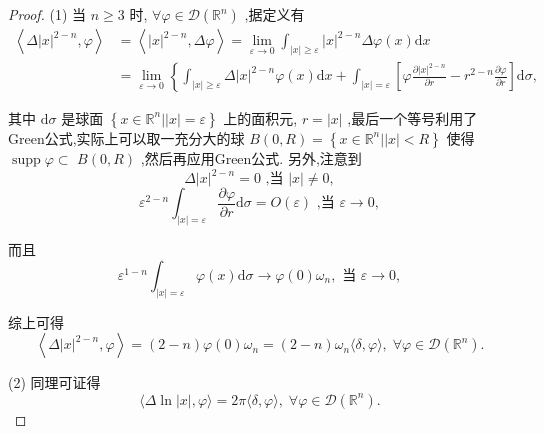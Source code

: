 \documentclass[lang=cn,newtx,10pt,scheme=chinese,thmcnt=chapter]{elegantbook}
\newcommand{\dif}{\mathrm{d}}
\begin{document}
\begin{proof}
  (1) 当 \(n \geq  3\) 时, \(\forall \varphi  \in  \mathcal{D}\left( {\mathbb{R}}^{n}\right)\) ,据定义有  
\begin{equation*}
\begin{aligned}
      \left\langle  {\Delta {\left| x\right| }^{2 - n},\varphi }\right\rangle  & = \left\langle  {{\left| x\right| }^{2 - n},{\Delta \varphi }}\right\rangle   = \mathop{\lim }\limits_{{\varepsilon  \rightarrow  0}}{\int }_{\left| x\right|  \geq  \varepsilon }{\left| x\right| }^{2 - n}{\Delta \varphi }\left( x\right) {\dif x}\\  &= \mathop{\lim }\limits_{{\varepsilon  \rightarrow  0}}\left\{  {{\int }_{\left| x\right|  \geq  \varepsilon }\Delta {\left| x\right| }^{2 - n}\varphi \left( x\right) {\dif x}}\right.
  + {\int }_{\left| x\right|  = \varepsilon }\left\lbrack  {\varphi \frac{\partial {\left| x\right| }^{2 - n}}{\partial r} - {r}^{2 - n}\frac{\partial \varphi }{\partial r}}\right\rbrack  {\dif\sigma },
\end{aligned}
  \end{equation*}
  
  其中 \({\dif\sigma }\) 是球面 \(\left\{  {x \in  {\mathbb{R}}^{n}\left| \right| x \mid   = \varepsilon }\right\}\) 上的面积元, \(r = \left| x\right|\) ,最后一个等号利用了Green公式,实际上可以取一充分大的球 \(B\left( {0,R}\right)  = \left\{  {x \in  {\mathbb{R}}^{n}\left| \right| x \mid   < R}\right\}\) 使得 \(\operatorname{supp}\varphi  \subset\)  \(B\left( {0,R}\right)\) ,然后再应用Green公式. 另外,注意到
  \begin{equation*}
  \Delta {\left| x\right| }^{2 - n} = 0\text{ ,当 }\left| x\right|  \neq  0,
  \end{equation*}\begin{equation*}
  {\varepsilon }^{2 - n}{\int }_{\left| x\right|  = \varepsilon }\frac{\partial \varphi }{\partial r}{\dif\sigma } = O\left( \varepsilon \right) \text{ ,当 }\varepsilon  \rightarrow  0,
  \end{equation*}
  
  而且
\begin{equation*}
  {\varepsilon }^{1 - n}{\int }_{\left| x\right|  = \varepsilon }\varphi \left( x\right) {\dif\sigma } \rightarrow  \varphi \left( 0\right) {\omega }_{n},\text{ 当 }\varepsilon  \rightarrow  0,
  \end{equation*}
  
  综上可得
  \begin{equation*}
  \left\langle  {\Delta {\left| x\right| }^{2 - n},\varphi }\right\rangle   = \left( {2 - n}\right) \varphi \left( 0\right) {\omega }_{n} = \left( {2 - n}\right) {\omega }_{n}\langle \delta ,\varphi \rangle ,\;\forall \varphi  \in  \mathcal{D}\left( {\mathbb{R}}^{n}\right) .
  \end{equation*}
  
  (2) 同理可证得
  \begin{equation*}
  \langle \Delta \ln \left| x\right| ,\varphi \rangle  = {2\pi }\langle \delta ,\varphi \rangle ,\;\forall \varphi  \in  \mathcal{D}\left( {\mathbb{R}}^{n}\right) .
  \end{equation*}
  
\end{proof}
\end{document}
